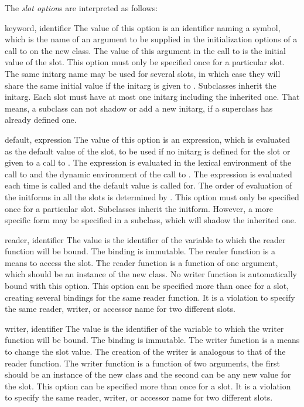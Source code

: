 \begin{optDefinition}
The {\em slot option\/}s are interpreted as follows:
\begin{options}
    \item[keyword, identifier]%
    The value of this option is an identifier naming a symbol, which is the name
    of an argument to be supplied in the initialization options of a call to
     on the new class.  The value of this argument in the call
    to  is the initial value of the slot.  This option must
    only be specified once for a particular slot.  The same initarg name may be
    used for several slots, in which case they will share the same initial value
    if the initarg is given to .  Subclasses inherit the
    initarg. Each slot must have at most one initarg including the inherited
    one. That means, a subclass can not shadow or add a new initarg, if a
    superclass has already defined one.

    \item[default, expression]%
    The value of this option is an expression, which is evaluated as the default
    value of the slot, to be used if no initarg is defined for the slot or given
    to a call to .  The expression is evaluated in the lexical
    environment of the call to  and the dynamic environment
    of the call to .  The expression is evaluated each time
     is called and the default value is called for.  The order
    of evaluation of the initforms in all the slots is determined by
    .  This option must only be specified once for a
    particular slot. Subclasses inherit the initform.  However, a more specific
    form may be specified in a subclass, which will shadow the inherited one.

    \item[reader, identifier]%
    The value is the identifier of the variable to which the reader function
    will be bound.  The binding is immutable.  The reader function is a means to
    access the slot.  The reader function is a function of one argument, which
    should be an instance of the new class.  No writer function is automatically
    bound with this option.  This option can be specified more than once for a
    slot, creating several bindings for the same reader function. It is a
    violation to specify the same reader, writer, or accessor name for two
    different slots.

    \item[writer, identifier]%
    The value is the identifier of the variable to which the writer function
    will be bound.  The binding is immutable.  The writer function is a means to
    change the slot value.  The creation of the writer is analogous to that of
    the reader function. The writer function is a function of two arguments, the
    first should be an instance of the new class and the second can be any new
    value for the slot.  This option can be specified more than once for a slot.
    It is a violation to specify the same reader, writer, or accessor name
    for two different slots.


\end{options}
\end{optDefinition}
